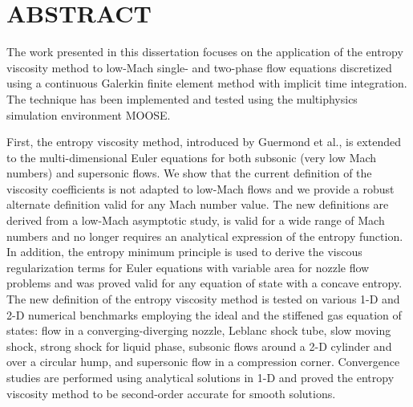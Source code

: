%
%
%

\chapter*{ABSTRACT}

\pagestyle{plain} %
\setcounter{page}{2}

The work presented in this dissertation focuses on the application of the entropy viscosity method to low-Mach single- and two-phase flow equations discretized using a continuous Galerkin finite element method with implicit time integration. The technique has been implemented and tested using the multiphysics simulation environment MOOSE.

First,  
the entropy viscosity method, introduced by Guermond et al., is extended to the multi-dimensional Euler 
equations for both subsonic (very low Mach numbers) and supersonic flows. 
We show that the current definition of the viscosity coefficients is not adapted to low-Mach flows 
and we provide a robust alternate definition valid for any Mach number value. The new definitions are derived from a 
low-Mach asymptotic study, is valid for a wide range of Mach numbers and no longer requires an analytical expression of the entropy function. In addition, the entropy minimum principle is used to derive 
the viscous regularization terms for Euler equations with variable area for nozzle flow problems and was proved valid for any equation of state with a concave entropy. 
The new definition of the entropy viscosity method is tested on various 1-D and 2-D numerical benchmarks employing the ideal and the stiffened gas equation of states: flow in a converging-diverging nozzle, Leblanc shock tube, slow moving 
shock, strong shock for liquid phase, subsonic flows around a 2-D cylinder and over a circular hump, and supersonic flow in a 
compression corner. Convergence studies are performed using analytical solutions in 1-D and proved the entropy viscosity method to be second-order accurate for smooth solutions.

